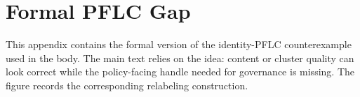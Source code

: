 \section{Formal PFLC Gap}
\label{app:pflc-gap}

This appendix contains the formal version of the identity-PFLC counterexample
used in the body. The main text relies on the idea: content or cluster quality
can look correct while the policy-facing handle needed for governance is
missing. The figure records the corresponding relabeling construction.


